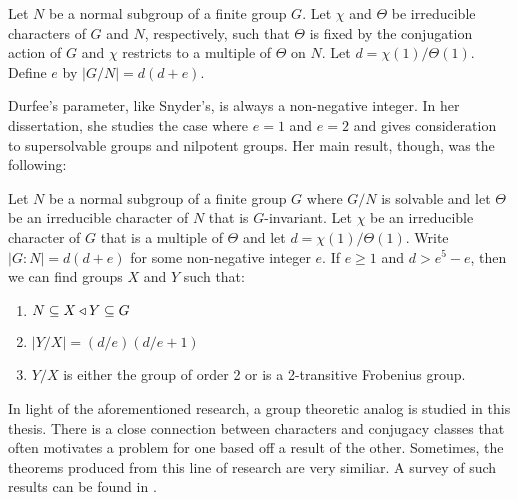 \documentclass[main.tex]{subfiles}
\begin{document}
\begin{definition}
Let $N$ be a normal subgroup of a finite group $G$. Let $\chi$ and $\Theta$ be irreducible characters of $G$ and $N$, respectively, such that $\Theta$ is fixed by the conjugation action of $G$ and $\chi$ restricts to a multiple of $\Theta$ on $N$. Let $d = \chi(1)/\Theta(1)$. Define $e$ by $|G/N| = d(d+e)$.
\end{definition}

\hss

\noindent Durfee's parameter, like Snyder's, is always a non-negative integer. In her dissertation, she studies the case where $e = 1$ and $e = 2$ and gives consideration to supersolvable groups and nilpotent groups. Her main result, though, was the following:

\hss

\begin{theorem}
Let $N$ be a normal subgroup of a finite group $G$ where $G/N$ is solvable and let $\Theta$ be an irreducible character of $N$ that is $G$-invariant. Let $\chi$ be an irreducible character of $G$ that is a multiple of $\Theta$ and let $d = \chi(1)/\Theta(1)$. Write $|G:N| = d(d+e)$ for some non-negative integer $e$. If $e \ge 1$ and $d > e^5 - e$, then we can find groups $X$ and $Y$ such that:
\begin{enumerate}
	\item $N \subseteq X \triangleleft Y \subseteq G$
	\item $|Y/X| = (d/e)(d/e+1)$
	\item $Y/X$ is either the group of order 2 or is a 2-transitive Frobenius group.
\end{enumerate}
\end{theorem}

\hss

In light of the aforementioned research, a group theoretic analog is studied in this thesis. There is a close connection between characters and conjugacy classes that often motivates a problem for one based off a result of the other. Sometimes, the theorems produced from this line of research are very similiar. A survey of such results can be found in \cite{chillagarticle}.
\end{document}
